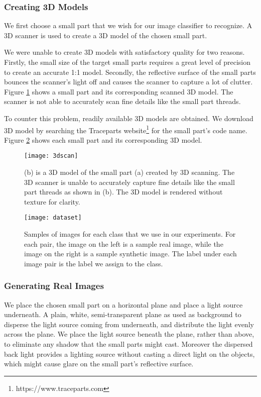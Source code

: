 \subsubsection{Creating 3D Models}
We first choose a small part that we wish for our image classifier to recognize. A 3D scanner is used to create a 3D model of the chosen small part.

We were unable to create 3D models with satisfactory quality for two reasons. Firstly, the small size of the target small parts requires a great level of precision to create an accurate 1:1 model. Secondly, the reflective surface of the small parts bounces the scanner's light off and causes the scanner to capture a lot of clutter. Figure \ref{fig:3dscans} shows a small part and its corresponding scanned 3D model. The scanner is not able to accurately scan fine details like the small part threads.

To counter this problem, readily available 3D models are obtained. We download 3D model by searching the Traceparts website\footnote{https://www.traceparts.com} for the small part's code name. Figure \ref{fig:Dataset} shows each small part and its corresponding 3D model. 

\begin{figure}[H]
\centering
  \texttt{[image: 3dscan]}
\caption{(b) is a 3D model of the small part (a) created by 3D scanning. The 3D scanner is unable to accurately capture fine details like the small part threads as shown in (b). The 3D model is rendered without texture for clarity.}
\label{fig:3dscans}
\end{figure}

\begin{figure}[H]
\centering
  \texttt{[image: dataset]}
\caption{Samples of images for each class that we use in our experiments. For each pair, the image on the left is a sample real image, while the image on the right is a sample synthetic image. The label under each image pair is the label we assign to the class.}
\label{fig:Dataset}
\end{figure}

\subsubsection{Generating Real Images}
We place the chosen small part on a horizontal plane and place a light source underneath. A plain, white, semi-transparent plane as used as background to disperse the light source coming from underneath, and distribute the light evenly across the plane. We place the light source beneath the plane, rather than above, to eliminate any shadow that the small parts might cast. Moreover the dispersed back light provides a lighting source without casting a direct light on the objects, which might cause glare on the small part's reflective surface.

